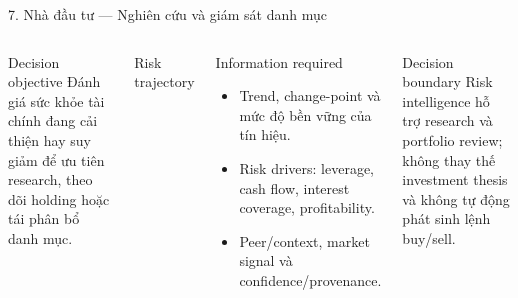 \documentclass[aspectratio=169,11pt]{beamer}
\begin{document}
\begin{frame}[shrink=8]{7. Nhà đầu tư — Nghiên cứu và giám sát danh mục}
  \small
  \begin{columns}[T,totalwidth=\textwidth]
      \begin{block}{Decision objective}
        Đánh giá sức khỏe tài chính đang cải thiện hay suy giảm để ưu tiên research, theo dõi holding hoặc tái phân bổ danh mục.
      \end{block}
      \begin{exampleblock}{Risk trajectory}
        \scriptsize
        \centering
      \end{exampleblock}
      \begin{block}{Information required}
        \scriptsize
        \begin{itemize}
          \item Trend, change-point và mức độ bền vững của tín hiệu.
          \item Risk drivers: leverage, cash flow, interest coverage, profitability.
          \item Peer/context, market signal và confidence/provenance.
        \end{itemize}
      \end{block}
      \begin{alertblock}{Decision boundary}
        \scriptsize
        Risk intelligence hỗ trợ research và portfolio review; không thay thế investment thesis và không tự động phát sinh lệnh buy/sell.
      \end{alertblock}
  \end{columns}
\end{frame}
\end{document}
